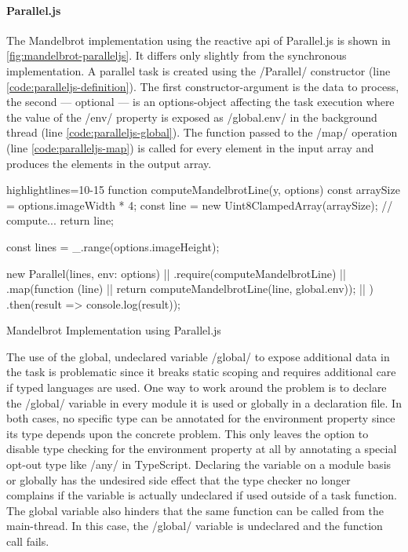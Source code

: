 \paragraph{Parallel.js}
The Mandelbrot implementation using the reactive api of Parallel.js is shown in \cref{fig:mandelbrot-paralleljs}. It differs only slightly from the synchronous implementation. A parallel task is created using the \javascriptinline/Parallel/ constructor (line \ref{code:paralleljs-definition}). The first constructor-argument is the data to process, the second --- optional ---  is an options-object affecting the task execution where the value of the \javascriptinline/env/ property is exposed as \javascriptinline/global.env/ in the background thread (line \ref{code:paralleljs-global}). The function passed to the \javascriptinline/map/ operation (line \ref{code:paralleljs-map}) is called for every element in the input array and produces the elements in the output array.

\begin{listing}
	\begin{javascriptcode*}{highlightlines={10-15}}
function computeMandelbrotLine(y, options) {
	const arraySize = options.imageWidth * 4;
	const line = new Uint8ClampedArray(arraySize);
	// compute...
	return line;
}

const lines = _.range(options.imageHeight);

new Parallel(lines, {env: options}) |$\label{code:paralleljs-definition}$|
	.require(computeMandelbrotLine)  |$\label{code:paralleljs-require}$|
	.map(function (line) { |$\label{code:paralleljs-map}$|
		return computeMandelbrotLine(line, global.env)); |$\label{code:paralleljs-global}$|
	})
	.then(result => console.log(result));
\end{javascriptcode*}

\caption{Mandelbrot Implementation using Parallel.js}
\label{fig:mandelbrot-paralleljs}
\end{listing}


The use of the global, undeclared variable \javascriptinline/global/ to expose additional data in the task is problematic since it breaks static scoping and requires additional care if typed languages are used. One way to work around the problem is to declare the \javascriptinline/global/ variable in every module it is used or globally in a declaration file. In both cases, no specific type can be annotated for the environment property since its type depends upon the concrete problem. This only leaves the option to disable type checking for the environment property at all by annotating a special opt-out type like \javascriptinline/any/ in TypeScript. Declaring the variable on a module basis or globally has the undesired side effect that the type checker no longer complains if the variable is actually undeclared if used outside of a task function. The global variable also hinders that the same function can be called from the main-thread. In this case, the \javascriptinline/global/ variable is undeclared and the function call fails.


